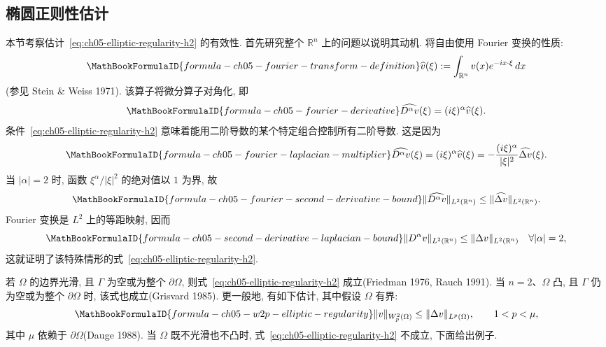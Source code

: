 \subsection{椭圆正则性估计}
\label{sec:ch05-elliptic-regularity-estimates}
\setcounter{thmcount}{0}
\setcounter{equation}{0}

本节考察估计~\eqref{eq:ch05-elliptic-regularity-h2} 的有效性. 首先研究整个 $\mathbb R^n$ 上的问题以说明其动机. 将自由使用 Fourier 变换的性质:
\[
\MathBookFormulaID{formula-ch05-fourier-transform-definition}
\widehat v(\xi):=\int_{\mathbb R^n}v(x)e^{-ix\cdot\xi}\,dx
\]
(参见 Stein \& Weiss 1971). 该算子将微分算子对角化, 即
\[
\MathBookFormulaID{formula-ch05-fourier-derivative}
\widehat{D^\alpha v}(\xi)=(i\xi)^\alpha\widehat v(\xi).
\]
条件~\eqref{eq:ch05-elliptic-regularity-h2} 意味着能用二阶导数的某个特定组合控制所有二阶导数. 这是因为
\[
\MathBookFormulaID{formula-ch05-fourier-laplacian-multiplier}
\widehat{D^\alpha v}(\xi)=(i\xi)^\alpha\widehat v(\xi)
=-\frac{(i\xi)^\alpha}{|\xi|^2}\widehat{\Delta v}(\xi).
\]
当 $|\alpha|=2$ 时, 函数 $\xi^\alpha/|\xi|^2$ 的绝对值以 $1$ 为界, 故
\[
\MathBookFormulaID{formula-ch05-fourier-second-derivative-bound}
\|\widehat{D^\alpha v}\|_{L^2(\mathbb R^n)}
\leq\|\widehat{\Delta v}\|_{L^2(\mathbb R^n)}.
\]
Fourier 变换是 $L^2$ 上的等距映射, 因而
\[
\MathBookFormulaID{formula-ch05-second-derivative-laplacian-bound}
\|D^\alpha v\|_{L^2(\mathbb R^n)}
\leq\|\Delta v\|_{L^2(\mathbb R^n)}
\quad\forall|\alpha|=2,
\]
这就证明了该特殊情形的式~\eqref{eq:ch05-elliptic-regularity-h2}.

若 $\Omega$ 的边界光滑, 且 $\Gamma$ 为空或为整个 $\partial\Omega$, 则式~\eqref{eq:ch05-elliptic-regularity-h2} 成立(Friedman 1976, Rauch 1991). 当 $n=2$、$\Omega$ 凸, 且 $\Gamma$ 仍为空或为整个 $\partial\Omega$ 时, 该式也成立(Grisvard 1985). 更一般地, 有如下估计, 其中假设 $\Omega$ 有界:
\begin{equation}
\MathBookFormulaID{formula-ch05-w2p-elliptic-regularity}
\label{eq:ch05-w2p-elliptic-regularity}
\|v\|_{W_p^2(\Omega)}\leq\|\Delta v\|_{L^p(\Omega)},
\qquad1<p<\mu,
\end{equation}
其中 $\mu$ 依赖于 $\partial\Omega$(Dauge 1988). 当 $\Omega$ 既不光滑也不凸时, 式~\eqref{eq:ch05-elliptic-regularity-h2} 不成立, 下面给出例子.


